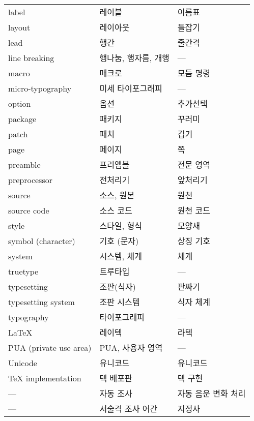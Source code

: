 \begin{longtable}{lll}
label & 레이블 & 이름표 \\
layout & 레이아웃 & 틀잡기 \\
lead & 행간 & 줄간격 \\
line breaking & 행나눔, 행자름, 개행 & --- \\
macro & 매크로 & 모듬 명령 \\
micro-typography & 미세 타이포그래피 & --- \\

option & 옵션 & 추가선택 \\

package & 패키지 & 꾸러미 \\
patch & 패치 & 깁기 \\
page & 페이지 & 쪽 \\
preamble & 프리앰블 & 전문 영역 \\
preprocessor & 전처리기 & 앞처리기 \\

source & 소스, 원본 & 원천 \\
source code & 소스 코드 & 원천 코드 \\
style & 스타일, 형식 & 모양새 \\
symbol (character) & 기호 (문자) & 상징 기호 \\
system & 시스템, 체계 & 체계 \\

truetype & 트루타입 & --- \\
typesetting & 조판(식자) & 판짜기 \\
typesetting system & 조판 시스템 & 식자 체계 \\
typography & 타이포그래피 & --- \\

\LaTeX & 레이텍 & 라텍 \\

PUA (private use area) & PUA, 사용자 영역 & --- \\

Unicode & 유니코드 & 유니코드 \\

\TeX{} implementation & 텍 배포판 & 텍 구현 \\

--- & 자동 조사 & 자동 음운 변화 처리 \\
--- & 서술격 조사 어간 & 지정사 \\

\hline

\end{longtable}

\endinput
